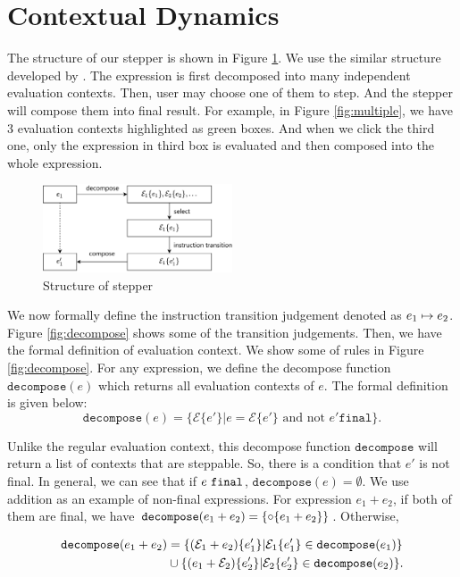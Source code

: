 \section{Contextual Dynamics}
\label{sec:condy}



The structure of our stepper is shown in Figure \ref{fig:structure}. We use the similar structure developed by \citet{cong_implementing_nodate}. The expression is first decomposed into many independent evaluation contexts. Then, user may choose one of them to step. And the stepper will compose them into final result. For example, in Figure \ref{fig:multiple}, we have 3 evaluation contexts highlighted as green boxes. And when we click the third one, only the expression in third box is evaluated and then composed into the whole expression.

\begin{figure}[htbp]
  \centering
  \includegraphics[width=0.5\textwidth]{img/struct.png}
  \caption{Structure of stepper}
  \label{fig:structure}
\end{figure}

We now formally define the instruction transition judgement denoted as $e_1 \mapsto e_2$. Figure \ref{fig:decompose} shows some of the transition judgements. Then, we have the formal definition of evaluation context. We show some of rules in Figure \ref{fig:decompose}. For any expression, we define the decompose function $\mathtt{decompose}(e)$ which returns all evaluation contexts of $e$. The formal definition is given below:
$$ \mathtt{decompose}(e) = \{ \mathcal{E}\{e'\} | e = \mathcal{E}\{e'\} \text{ and not } e' \mathtt{final} \}. $$

Unlike the regular evaluation context, this decompose function $\mathtt{decompose}$ will return a list of contexts that are steppable. So, there is a condition that $e'$ is not final. In general, we can see that if $e ~\mathtt{final}$, $\mathtt{decompose}(e) = \emptyset$. We use addition as an example of non-final expressions. For expression $e_1 + e_2$, if both of them are final, we have $\mathtt{decompose}(e_1 + e_2) = \{ \circ \{e_1+e_2\} \}$. Otherwise, 


\begin{align*}
  \mathtt{decompose}(e_1 + e_2) &= \{ (\mathcal{E}_1 + e_2) \{e_1'\} | \mathcal{E}_1 \{e_1'\} \in \mathtt{decompose}(e_1)\} \\
  &\cup \{ (e_1 + \mathcal{E}_2) \{e_2'\} | \mathcal{E}_2 \{e_2'\} \in \mathtt{decompose}(e_2)\}.
\end{align*}


